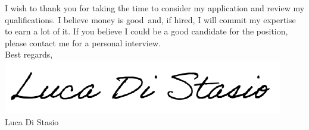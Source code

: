\documentclass[
  a4paper, 
]{fortysecondscv}
\def\finalbelief{money is good}
\def\finalcommitment{earn a lot of it}
\begin{document}
I wish to thank you for taking the time to consider my application and review my qualifications. I believe \finalbelief\ and, if hired, I will commit my expertise to \finalcommitment. If you believe I could be a good candidate for the position, please contact me for a personal interview.\\[12pt]
Best regards,\\
\includegraphics[scale=0.75]{Signature.png}\\
Luca Di Stasio
\end{document}
